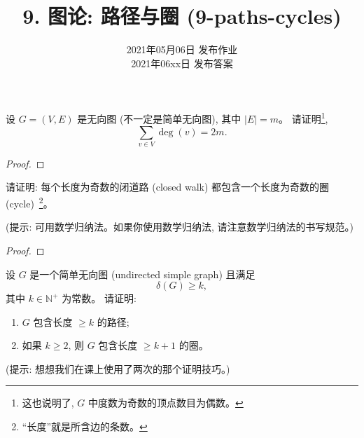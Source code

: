 \documentclass[a4paper, justified]{tufte-handout}
\title{9. 图论: 路径与圈 (9-paths-cycles)}
\date{2021年05月06日 发布作业 \\ 2021年06xx日 发布答案}
\begin{document}
\maketitle
\noplagiarism %
\begin{abstract}
\end{abstract}
\beginrequired

\begin{problem}
  设 $G = (V, E)$ 是无向图 (不一定是简单无向图),
  其中 $|E| = m$。
  请证明\footnote{这也说明了, $G$ 中度数为奇数的顶点数目为偶数。},
  \[
    \sum_{v \in V} \deg(v) = 2m.
  \]
\end{problem}

\begin{proof}
\end{proof}

\begin{problem}
  请证明: 每个长度为奇数的闭道路 (closed walk) 都包含一个长度为奇数的圈 (cycle)~\footnote{
    ``长度''就是所含边的条数。}。

  \vspace{1em}
  \noindent (提示: 可用数学归纳法。如果你使用数学归纳法, 请注意数学归纳法的书写规范。)
\end{problem}

\begin{proof}
\end{proof}

\begin{problem}[\score{4 = 2 + 2} $\star\star\star$]
  设 $G$ 是一个简单无向图 (undirected simple graph) 且满足
  \[
    \delta(G) \ge k,
  \]
  其中 $k \in \mathbb{N}^{+}$ 为常数。
  请证明:
  \begin{enumerate}[(1)]
    \item $G$ 包含长度 $\ge k$ 的路径;
    \item 如果 $k \ge 2$, 则 $G$ 包含长度 $\ge k + 1$ 的圈。
  \end{enumerate}

  \vspace{1em}
  \noindent (提示: 想想我们在课上使用了两次的那个证明技巧。)
\end{problem}
\end{document}
